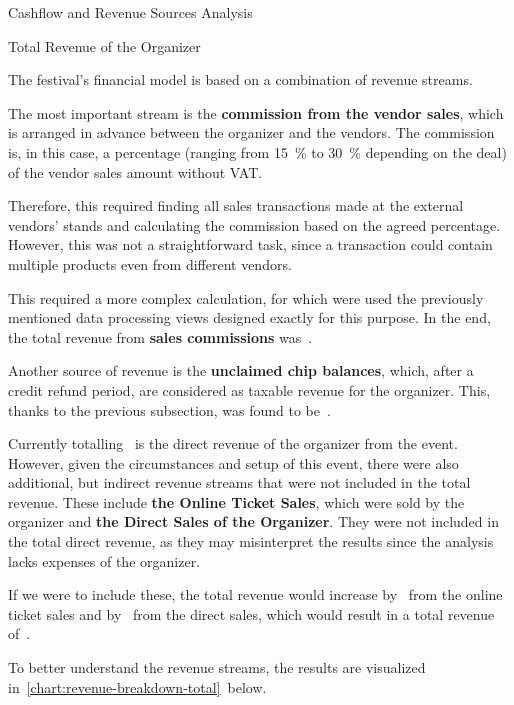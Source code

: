 \begin{section}{Cashflow and Revenue Sources Analysis}
	\pagebreak[4]

	\begin{subsection}{Total Revenue of the Organizer}
		\label{subsec:analysis-total-revenue}

		The festival's financial model is based on a combination of revenue streams.

		The most important stream is the \textbf{commission from the vendor sales}, which is arranged in advance between the organizer and the vendors.
		The commission is, in this case, a percentage (ranging from 15~\% to 30~\% depending on the deal) of the vendor sales amount without VAT\@.

		Therefore, this required finding all sales transactions made at the external vendors' stands and calculating the commission based on the agreed percentage.
		However, this was not a straightforward task, since a transaction could contain multiple products even from different vendors.

		This required a more complex calculation, for which were used the previously mentioned data processing views designed exactly for this purpose.
		In the end, the total revenue from \textbf{sales commissions} was~.

		Another source of revenue is the \textbf{unclaimed chip balances}, which, after a credit refund period, are considered as taxable revenue for the organizer.
		This, thanks to the previous subsection, was found to be~.

		Currently totalling~ is the direct revenue of the organizer from the event.
		However, given the circumstances and setup of this event, there were also additional, but indirect revenue streams that were not included in the total revenue.
		These include \textbf{the Online Ticket Sales}, which were sold by the organizer and \textbf{the Direct Sales of the Organizer}.
		They were not included in the total direct revenue, as they may misinterpret the results since the analysis lacks expenses of the organizer.

		If we were to include these, the total revenue would increase by~ from the online ticket sales and by~ from the direct sales, which would result in a total revenue of~.

		To better understand the revenue streams, the results are visualized in~\autoref{chart:revenue-breakdown-total}~below.


\end{subsection}
\end{section}
